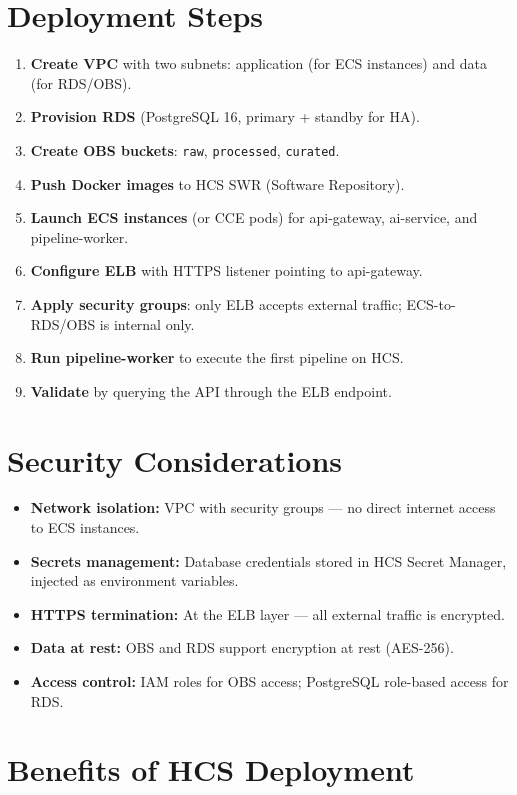\section{Deployment Steps}

\begin{enumerate}
  \item \textbf{Create VPC} with two subnets: application (for ECS instances) and data (for RDS/OBS).
  \item \textbf{Provision RDS} (PostgreSQL 16, primary + standby for HA).
  \item \textbf{Create OBS buckets}: \texttt{raw}, \texttt{processed}, \texttt{curated}.
  \item \textbf{Push Docker images} to HCS SWR (Software Repository).
  \item \textbf{Launch ECS instances} (or CCE pods) for api-gateway, ai-service, and pipeline-worker.
  \item \textbf{Configure ELB} with HTTPS listener pointing to api-gateway.
  \item \textbf{Apply security groups}: only ELB accepts external traffic; ECS-to-RDS/OBS is internal only.
  \item \textbf{Run pipeline-worker} to execute the first pipeline on HCS.
  \item \textbf{Validate} by querying the API through the ELB endpoint.
\end{enumerate}

\section{Security Considerations}

\begin{itemize}
  \item \textbf{Network isolation:} VPC with security groups --- no direct internet access to ECS instances.
  \item \textbf{Secrets management:} Database credentials stored in HCS Secret Manager, injected as environment variables.
  \item \textbf{HTTPS termination:} At the ELB layer --- all external traffic is encrypted.
  \item \textbf{Data at rest:} OBS and RDS support encryption at rest (AES-256).
  \item \textbf{Access control:} IAM roles for OBS access; PostgreSQL role-based access for RDS.
\end{itemize}

\section{Benefits of HCS Deployment}

